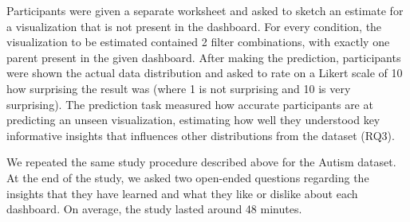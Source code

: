  Participants were given a separate worksheet and asked to sketch an estimate for a visualization that is not present in the dashboard. For every condition, the visualization to be estimated contained 2 filter combinations, with exactly one parent present in the given dashboard. After making the prediction, participants were shown the actual data distribution and asked to rate on a Likert scale of 10 how surprising the result was (where 1 is not surprising and 10 is very surprising). The prediction task measured how accurate participants are at predicting an unseen visualization, estimating how well they understood key informative insights that influences other distributions from the dataset (RQ3).
\par We repeated the same study procedure described above for the Autism dataset. At the end of the study, we asked two open-ended questions regarding the insights that they have learned and what they like or dislike about each dashboard. On average, the study lasted around 48 minutes.
